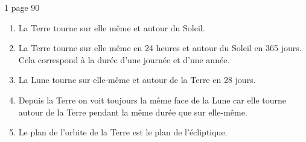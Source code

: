 \begin{myact}{1 page 90}
	\begin{enumerate}
		\item La Terre tourne sur elle même et autour du Soleil. \pause
		\item La Terre tourne sur elle même en 24 heures et autour du Soleil en 365 jours. Cela correspond à la durée d'une journée et d'une année.\pause
		\item La Lune tourne sur elle-même et autour de la Terre en 28 jours. \pause
		\item Depuis la Terre on voit toujours la même face de la Lune car elle tourne autour de la Terre pendant la même durée que sur elle-même.\pause
		\item Le plan de l'orbite de la Terre est le plan de l'écliptique.
	\end{enumerate}
\end{myact}